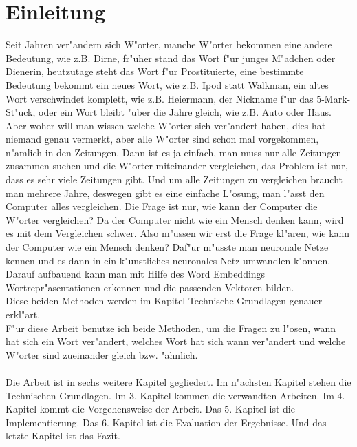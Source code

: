 \chapter{Einleitung}

Seit Jahren ver"andern sich W"orter, manche W"orter bekommen eine andere Bedeutung, wie z.B. Dirne, fr"uher stand das Wort f"ur junges M"adchen oder Dienerin, heutzutage steht das Wort f"ur Prostituierte, eine bestimmte Bedeutung bekommt ein neues Wort, wie z.B. Ipod statt Walkman, ein altes Wort verschwindet komplett, wie z.B. Heiermann, der Nickname f"ur das 5-Mark-St"uck, oder ein Wort bleibt "uber die Jahre gleich, wie z.B. Auto oder Haus. Aber woher will man wissen welche W"orter sich ver"andert haben, dies hat niemand genau vermerkt, aber alle W"orter sind schon mal vorgekommen, n"amlich in den Zeitungen. Dann ist es ja einfach,  man muss nur alle Zeitungen zusammen suchen und die W"orter miteinander vergleichen, das Problem ist nur, dass es sehr viele Zeitungen gibt. Und um alle Zeitungen zu vergleichen braucht man mehrere Jahre, deswegen gibt es eine einfache L"osung, man l"asst den Computer alles vergleichen. Die Frage ist nur, wie kann der Computer die W"orter vergleichen? Da der Computer nicht wie ein Mensch denken kann, wird es mit dem Vergleichen schwer. Also m"ussen wir erst die Frage kl"aren, wie kann der Computer wie ein Mensch denken?
Daf"ur m"usste man neuronale Netze kennen und es dann in ein k"unstliches neuronales Netz umwandlen k"onnen.  Darauf aufbauend kann man mit Hilfe des Word Embeddings Wortrepr"asentationen erkennen und die passenden Vektoren bilden.\\
Diese beiden Methoden werden im Kapitel Technische Grundlagen genauer erkl"art.\\
F"ur diese Arbeit benutze ich beide Methoden, um die Fragen zu l"osen, wann hat sich ein Wort ver"andert, welches Wort hat sich wann ver"andert und welche W"orter sind zueinander gleich bzw. "ahnlich.\\\\

Die Arbeit ist in sechs weitere Kapitel gegliedert.
Im n"achsten Kapitel stehen die Technischen Grundlagen. Im 3. Kapitel kommen die verwandten Arbeiten. Im 4. Kapitel kommt die Vorgehensweise der Arbeit. Das 5. Kapitel ist die Implementierung. Das 6. Kapitel ist die Evaluation der Ergebnisse. Und das letzte Kapitel ist das Fazit.






